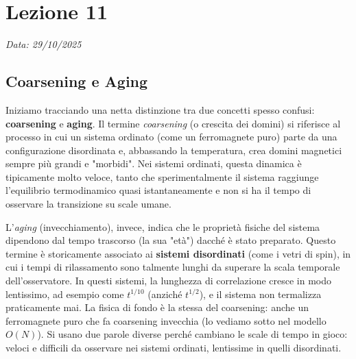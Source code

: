 \chapter{Lezione 11} \label{chap:lezione_11}
\begin{flushright}
\textit{Data: 29/10/2025}
\end{flushright}

\section{Coarsening e Aging}
Iniziamo tracciando una netta distinzione tra due concetti spesso confusi: \textbf{coarsening} e \textbf{aging}. 
Il termine \textit{coarsening} (o crescita dei domini) si riferisce al processo in cui un sistema ordinato (come un ferromagnete puro) parte da una configurazione disordinata e, abbassando la temperatura, crea domini magnetici sempre più grandi e "morbidi". 
Nei sistemi ordinati, questa dinamica è tipicamente molto veloce, tanto che sperimentalmente il sistema raggiunge l'equilibrio termodinamico quasi istantaneamente e non si ha il tempo di osservare la transizione su scale umane.

L'\textit{aging} (invecchiamento), invece, indica che le proprietà fisiche del sistema dipendono dal tempo trascorso (la sua "età") dacché è stato preparato. Questo termine è storicamente associato ai \textbf{sistemi disordinati} (come i vetri di spin), in cui i tempi di rilassamento sono talmente lunghi da superare la scala temporale dell'osservatore. In questi sistemi, la lunghezza di correlazione cresce in modo lentissimo, ad esempio come $t^{1/10}$ (anziché $t^{1/2}$), e il sistema non termalizza praticamente mai. La fisica di fondo è la stessa del coarsening: anche un ferromagnete puro che fa coarsening invecchia (lo vediamo sotto nel modello $O(N)$). Si usano due parole diverse perché cambiano le scale di tempo in gioco: veloci e difficili da osservare nei sistemi ordinati, lentissime in quelli disordinati.

